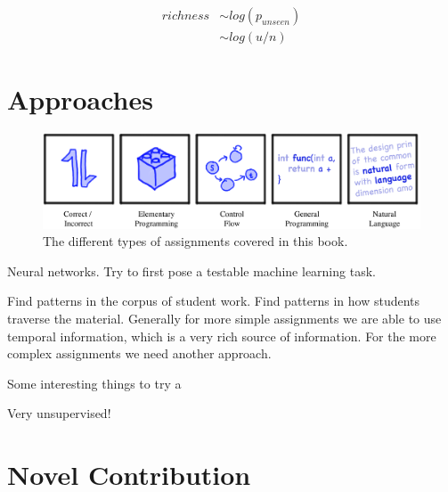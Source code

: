 \begin{align}
richness &\sim log(p_{unseen}) \\
         &\sim log(u/n)
\end{align}

\section{Approaches}

\begin{figure}
\center
\includegraphics[width=1.0\textwidth]{img/assnType_all}
\caption{
The different types of assignments covered in this book.
}
\end{figure}

Neural networks. Try to first pose a testable machine learning task. \cite{piech2012modeling}

Find patterns in the corpus of student work. Find patterns in how students traverse the material. Generally for more simple assignments we are able to use temporal information, which is a very rich source of information. For the more complex assignments we need another approach.

Some interesting things to try a

Very unsupervised!

\section{Novel Contribution}

